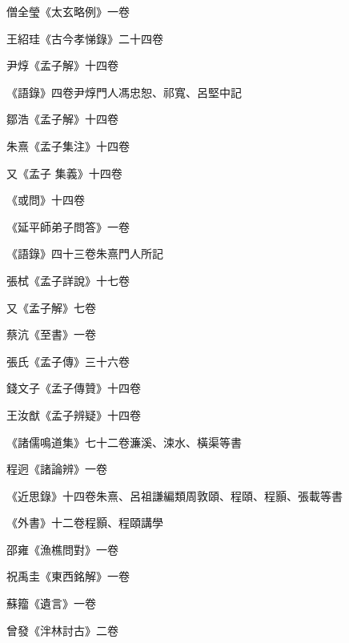 \begin{pinyinscope}
 僧全瑩《太玄略例》一卷



 王紹珪《古今孝悌錄》二十四卷



 尹焞《孟子解》十四卷



 《語錄》四卷尹焞門人馮忠恕、祁寬、呂堅中記



 鄒浩《孟子解》十四卷



 朱熹《孟子集注》十四卷



 又《孟子
 集義》十四卷



 《或問》十四卷



 《延平師弟子問答》一卷



 《語錄》四十三卷朱熹門人所記



 張栻《孟子詳說》十七卷



 又《孟子解》七卷



 蔡沆《至書》一卷



 張氏《孟子傳》三十六卷



 錢文子《孟子傳贊》十四卷



 王汝猷《孟子辨疑》十四卷



 《諸儒鳴道集》七十二卷濂溪、涑水、橫渠等書



 程迥《諸論辨》一卷



 《近思錄》十四卷朱熹、呂祖謙編類周敦頤、程頤、程顥、張載等書



 《外書》十二卷程顥、程頤講學



 邵雍《漁樵問對》一卷



 祝禹圭《東西銘解》一卷



 蘇籀《遺言》一卷



 曾發《泮林討古》二卷




\end{pinyinscope}
